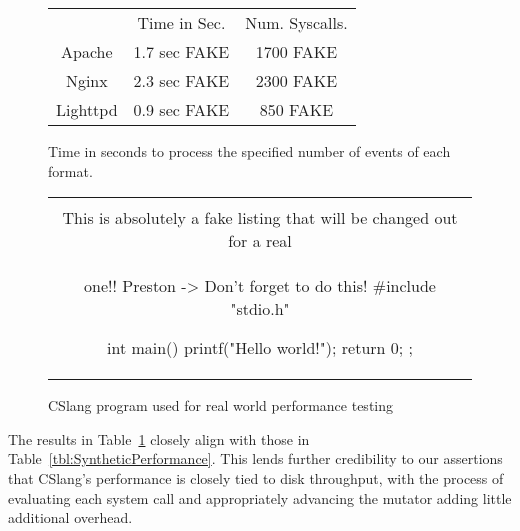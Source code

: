 \begin{figure}
  \begin{tabular}{|c|c|c}
                & Time in Sec. & Num. Syscalls.\\
  Apache        & 1.7 sec FAKE & 1700 FAKE      \\
  Nginx         & 2.3 sec FAKE & 2300 FAKE      \\
  Lighttpd      & 0.9 sec FAKE & 850  FAKE      \\
\end{tabular}
\caption{Time in seconds to process the specified number of events of each format.}
\label{tbl:RealWorldPerformance}
\end{figure}

\begin{figure}[H]
\centering
\begin{tabular}{c}
\begin{lstlisting}
\\ This is absolutely a fake listing that will be changed out for a real
\\ one!!  Preston -> Don't forget to do this!
#include "stdio.h"

int main() {
    printf("Hello world!\n");
    return 0;
};
\end{lstlisting}
\end{tabular}
\caption{CSlang program used for real world performance testing}
\label{lst:RealWorldPerformance}
\end{figure}

The results in Table~\ref{tbl:RealWorldPerformance} closely align with
those in Table~\ref{tbl:SyntheticPerformance}.  This lends further
credibility to our assertions that CSlang's performance is closely tied to
disk throughput, with
the process of evaluating each system call and appropriately advancing the
mutator adding little additional overhead.
